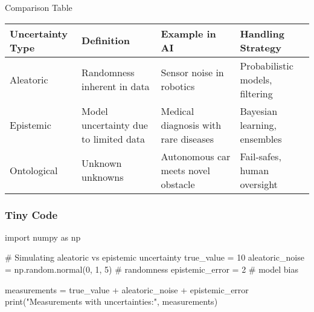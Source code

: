 \documentclass[
  letterpaper,
  DIV=11,
  numbers=noendperiod]{scrreprt}
\newenvironment{Shaded}{\begin{snugshade}}{\end{snugshade}}
\newcommand{\BuiltInTok}[1]{\textcolor[rgb]{0.00,0.23,0.31}{#1}}
\newcommand{\CommentTok}[1]{\textcolor[rgb]{0.37,0.37,0.37}{#1}}
\newcommand{\DecValTok}[1]{\textcolor[rgb]{0.68,0.00,0.00}{#1}}
\newcommand{\ImportTok}[1]{\textcolor[rgb]{0.00,0.46,0.62}{#1}}
\newcommand{\NormalTok}[1]{\textcolor[rgb]{0.00,0.23,0.31}{#1}}
\newcommand{\OperatorTok}[1]{\textcolor[rgb]{0.37,0.37,0.37}{#1}}
\newcommand{\StringTok}[1]{\textcolor[rgb]{0.13,0.47,0.30}{#1}}
\begin{document}
Comparison Table

\begin{longtable}[]{@{}
  >{\raggedright\arraybackslash}p{}
  >{\raggedright\arraybackslash}p{}
  >{\raggedright\arraybackslash}p{}
  >{\raggedright\arraybackslash}p{}@{}}
\toprule\noalign{}
\begin{minipage}[b]{\linewidth}\raggedright
Uncertainty Type
\end{minipage} & \begin{minipage}[b]{\linewidth}\raggedright
Definition
\end{minipage} & \begin{minipage}[b]{\linewidth}\raggedright
Example in AI
\end{minipage} & \begin{minipage}[b]{\linewidth}\raggedright
Handling Strategy
\end{minipage} \\
\midrule\noalign{}
\endhead
\bottomrule\noalign{}
\endlastfoot
Aleatoric & Randomness inherent in data & Sensor noise in robotics &
Probabilistic models, filtering \\
Epistemic & Model uncertainty due to limited data & Medical diagnosis
with rare diseases & Bayesian learning, ensembles \\
Ontological & Unknown unknowns & Autonomous car meets novel obstacle &
Fail-safes, human oversight \\
\end{longtable}

\subsubsection{Tiny Code}\label{tiny-code-29}

\begin{Shaded}
\begin{Highlighting}[]
\ImportTok{import}\NormalTok{ numpy }\ImportTok{as}\NormalTok{ np}

\CommentTok{\# Simulating aleatoric vs epistemic uncertainty}
\NormalTok{true\_value }\OperatorTok{=} \DecValTok{10}
\NormalTok{aleatoric\_noise }\OperatorTok{=}\NormalTok{ np.random.normal(}\DecValTok{0}\NormalTok{, }\DecValTok{1}\NormalTok{, }\DecValTok{5}\NormalTok{)  }\CommentTok{\# randomness}
\NormalTok{epistemic\_error }\OperatorTok{=} \DecValTok{2}  \CommentTok{\# model bias}

\NormalTok{measurements }\OperatorTok{=}\NormalTok{ true\_value }\OperatorTok{+}\NormalTok{ aleatoric\_noise }\OperatorTok{+}\NormalTok{ epistemic\_error}
\BuiltInTok{print}\NormalTok{(}\StringTok{"Measurements with uncertainties:"}\NormalTok{, measurements)}
\end{Highlighting}
\end{Shaded}
\end{document}
